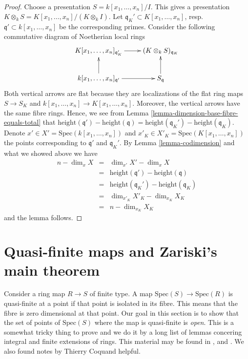 \begin{proof}
Choose a presentation $S = k[x_1, \ldots, x_n]/I$.
This gives a presentation
$K \otimes_k S = K[x_1, \ldots, x_n]/(K\otimes_k I)$.
Let $\mathfrak q_K' \subset K[x_1, \ldots, x_n]$,
resp.\ $\mathfrak q' \subset k[x_1, \ldots, x_n]$ be
the corresponding primes. Consider the following
commutative diagram of Noetherian local rings
$$
\xymatrix{
K[x_1, \ldots, x_n]_{\mathfrak q_K'} \ar[r] &
(K \otimes_k S)_{\mathfrak q_K} \\
k[x_1, \ldots, x_n]_{\mathfrak q'} \ar[r] \ar[u] &
S_{\mathfrak q} \ar[u]
}
$$
Both vertical arrows are flat because they are localizations of
the flat ring maps $S \to S_K$ and
$k[x_1, \ldots, x_n] \to K[x_1, \ldots, x_n]$.
Moreover, the vertical arrows have the same fibre rings.
Hence, we see from
Lemma \ref{lemma-dimension-base-fibre-equals-total} that
$\text{height}(\mathfrak q') - \text{height}(\mathfrak q)
= \text{height}(\mathfrak q_K') - \text{height}(\mathfrak q_K)$.
Denote $x' \in X' = \text{Spec}(k[x_1, \ldots, x_n])$
and $x'_K \in X'_K = \text{Spec}(K[x_1, \ldots, x_n])$
the points corresponding to $\mathfrak q'$ and
$\mathfrak q_K'$. By Lemma \ref{lemma-codimension} and what we showed
above we have
\begin{eqnarray*}
n - \dim_x X & = & \dim_{x'} X' - \dim_x X \\
& = & \text{height}(\mathfrak q') - \text{height}(\mathfrak q) \\
& = & \text{height}(\mathfrak q_K') - \text{height}(\mathfrak q_K) \\
& = & \dim_{x'_K} X'_K - \dim_{x_K} X_K \\
& = & n - \dim_{x_K} X_K
\end{eqnarray*}
and the lemma follows.
\end{proof}






















\section{Quasi-finite maps and Zariski's main theorem}
\label{section-Zariski}

\noindent
Consider a ring map $R \to S$ of finite type.
A map $\text{Spec}(S) \to \text{Spec}(R)$ is quasi-finite
at a point if that point is isolated in its fibre.
This means that the fibre is zero dimensional at that point.
Our goal in this section is to show that the set
of points of $\text{Spec}(S)$ where the map is quasi-finite
is {\it open}. This is a somewhat tricky thing to prove and
we do it by a long list of lemmas concering integral and
finite extensions of rings. This material may be found
in \cite{Henselian}, and \cite{Peskine}. We also found notes
by Thierry Coquand helpful.

